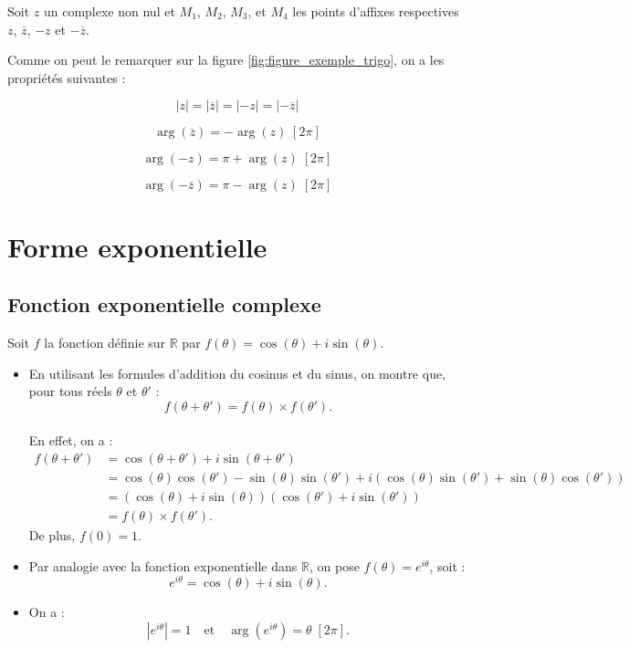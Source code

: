 \documentclass[a4paper,12pt]{article}
\begin{document}
    Soit $z$ un complexe non nul et $M_1$, $M_2$, $M_3$, et $M_4$ les points d’affixes respectives $z$, $\overline{z}$, $-z$ et $-\overline{z}$.

    Comme on peut le remarquer sur la figure \ref{fig:figure_exemple_trigo}, on a les propriétés suivantes :

    \[
        |z| = |\overline{z}| = |{-z}| = |{-\overline{z}}|
    \]

    \[
        \arg(\overline{z}) = -\arg(z) \; [2\pi]
    \]

    \[
        \arg(-z) = \pi + \arg(z) \; [2\pi]
    \]

    \[
        \arg(-\overline{z}) = \pi - \arg(z) \; [2\pi]
    \]

    \section{Forme exponentielle}

    \subsection{Fonction exponentielle complexe}

    Soit $f$ la fonction définie sur $\mathbb{R}$ par $f(\theta) = \cos(\theta) + i\sin(\theta)$.

    \begin{itemize}
        \item En utilisant les formules d’addition du cosinus et du sinus, on montre que, pour tous réels $\theta$ et $\theta'$ :
        \[
            f(\theta + \theta') = f(\theta) \times f(\theta').
        \] \\
        En effet, on a : \\
        \begin{align*}
            f(\theta + \theta') &= \cos(\theta + \theta') + i\sin(\theta + \theta') \\
            &= \cos(\theta)\cos(\theta') - \sin(\theta)\sin(\theta') + i(\cos(\theta)\sin(\theta') + \sin(\theta)\cos(\theta')) \\
            &= (\cos(\theta) + i\sin(\theta))(\cos(\theta') + i\sin(\theta')) \\
            &= f(\theta) \times f(\theta').
        \end{align*}
        De plus, $f(0) = 1$.
        \item Par analogie avec la fonction exponentielle dans $\mathbb{R}$, on pose $f(\theta) = e^{i\theta}$, soit :
        \[
            e^{i\theta} = \cos(\theta) + i\sin(\theta).
        \]
        \item On a :
        \[
            |e^{i\theta}| = 1 \quad \text{et} \quad \arg(e^{i\theta}) = \theta \; [2\pi].
        \]
    \end{itemize}
\end{document}
